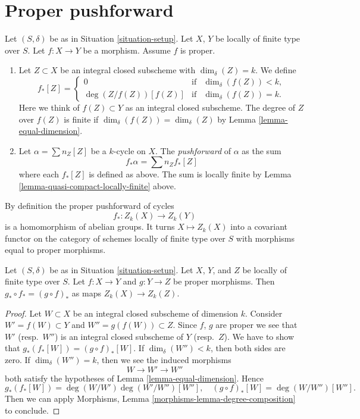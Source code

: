 \section{Proper pushforward}
\label{section-proper-pushforward}

\begin{definition}
\label{definition-proper-pushforward}
Let $(S, \delta)$ be as in Situation \ref{situation-setup}.
Let $X$, $Y$ be locally of finite type over $S$.
Let $f : X \to Y$ be a morphism.
Assume $f$ is proper.
\begin{enumerate}
\item Let $Z \subset X$ be an integral closed subscheme
with $\dim_\delta(Z) = k$. We define
$$
f_*[Z] =
\left\{
\begin{matrix}
0 & \text{if} & \dim_\delta(f(Z))< k, \\
\deg(Z/f(Z)) [f(Z)] & \text{if} & \dim_\delta(f(Z)) = k.
\end{matrix}
\right.
$$
Here we think of $f(Z) \subset Y$ as an integral closed subscheme.
The degree of $Z$ over $f(Z)$ is finite if
$\dim_\delta(f(Z)) = \dim_\delta(Z)$
by Lemma \ref{lemma-equal-dimension}.
\item Let $\alpha = \sum n_Z [Z]$ be a $k$-cycle on $X$. The
{\it pushforward} of $\alpha$ as the sum
$$
f_* \alpha = \sum n_Z f_*[Z]
$$
where each $f_*[Z]$ is defined as above. The sum is locally finite
by Lemma \ref{lemma-quasi-compact-locally-finite} above.
\end{enumerate}
\end{definition}

\noindent
By definition the proper pushforward of cycles
$$
f_* : Z_k(X) \longrightarrow Z_k(Y)
$$
is a homomorphism of abelian groups. It turns $X \mapsto Z_k(X)$
into a covariant functor on the category of schemes locally of
finite type over $S$ with morphisms equal to proper morphisms.

\begin{lemma}
\label{lemma-compose-pushforward}
Let $(S, \delta)$ be as in Situation \ref{situation-setup}.
Let $X$, $Y$, and $Z$ be locally of finite type over $S$.
Let $f : X \to Y$ and $g : Y \to Z$ be proper morphisms.
Then $g_* \circ f_* = (g \circ f)_*$ as maps $Z_k(X) \to Z_k(Z)$.
\end{lemma}

\begin{proof}
Let $W \subset X$ be an integral closed subscheme of dimension $k$.
Consider $W' = f(W) \subset Y$ and $W'' = g(f(W)) \subset Z$.
Since $f$, $g$ are proper we see that $W'$ (resp.\ $W''$) is
an integral closed subscheme of $Y$ (resp.\ $Z$).
We have to show that $g_*(f_*[W]) = (g \circ f)_*[W]$.
If $\dim_\delta(W'') < k$, then both sides are zero.
If $\dim_\delta(W'') = k$, then we see the induced morphisms
$$
W \longrightarrow
W' \longrightarrow
W''
$$
both satisfy the hypotheses of Lemma \ref{lemma-equal-dimension}. Hence
$$
g_*(f_*[W]) = \deg(W/W')\deg(W'/W'')[W''],
\quad
(g \circ f)_*[W] = \deg(W/W'')[W''].
$$
Then we can apply
Morphisms, Lemma \ref{morphisms-lemma-degree-composition}
to conclude.
\end{proof}

